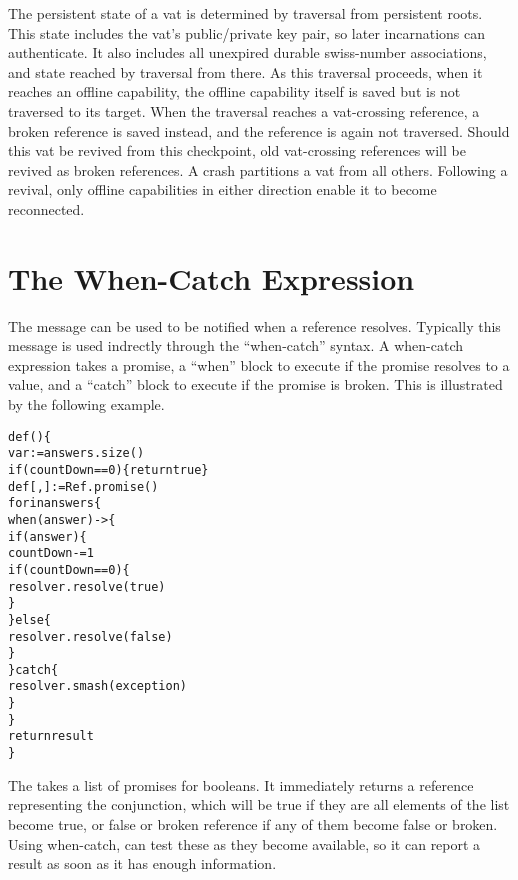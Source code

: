 \documentclass{llncs}
\begin{document}
The persistent state of a vat is determined by traversal from
persistent roots. This state includes the vat's public/private key
pair, so later incarnations can authenticate. It also includes all
unexpired durable swiss-number associations, and state reached by
traversal from there. As this traversal proceeds, when it reaches an
offline capability, the offline capability itself is saved but is not
traversed to its target. When the traversal reaches a vat-crossing
reference, a broken reference is saved instead, and the reference is
again not traversed. Should this vat be revived from this checkpoint,
old vat-crossing references will be revived as broken references. A
crash partitions a vat from all others. Following a revival, only
offline capabilities in either direction enable it to become
reconnected.

\section{The When-Catch Expression}

The  message can be used to be notified
when a reference resolves. Typically this message is used indrectly
through the ``when-catch'' syntax. A when-catch expression takes a
promise, a ``when'' block to execute if the promise resolves to a
value, and a ``catch'' block to execute if the promise is broken.
This is illustrated by the following example.
%
\begin{alltt}
   def () \{
       var  := answers.size()
       if (countDown == 0) \{ return true \}
       def [, ] := Ref.promise()
       for  in answers \{
           when (answer) -> \{
               if (answer) \{
                   countDown -= 1
                   if (countDown == 0) \{
                       resolver.resolve(true)
                   \}
               \} else \{
                   resolver.resolve(false)
               \}
           \} catch  \{
               resolver.smash(exception)
           \}
       \}
       return result
   \}
\end{alltt}
%
The  takes a list of promises for booleans. It
immediately returns a reference representing the conjunction, which
will be true if they are all elements of the list become true, or
false or broken reference if any of them become false or broken.
Using when-catch,  can test these as they become
available, so it can report a result as soon as it has enough
information.
\end{document}
